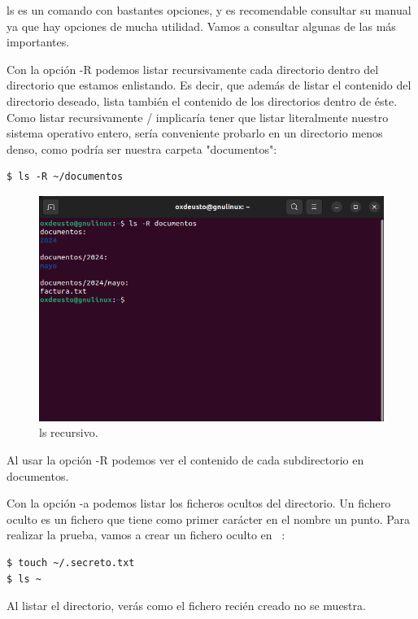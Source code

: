 ls es un comando con bastantes opciones, y es recomendable consultar su manual ya que hay opciones de mucha utilidad. Vamos a consultar algunas de las más importantes.

Con la opción -R podemos listar recursivamente cada directorio dentro del directorio que estamos enlistando. Es decir, que además de listar el contenido del directorio deseado, lista también el contenido de los directorios dentro de éste. Como listar recursivamente / implicaría tener que listar literalmente nuestro sistema operativo entero, sería conveniente probarlo en un directorio menos denso, como podría ser nuestra carpeta "documentos":

\begin{tcolorbox-code}
\begin{lstlisting}
$ ls -R ~/documentos
\end{lstlisting}
\end{tcolorbox-code}
\begin{figure}[H]
    \centering
    \includegraphics[width=0.80\linewidth]{resources/images/ls_2.png}
    \caption{ls recursivo.}
\end{figure}

Al usar la opción -R podemos ver el contenido de cada subdirectorio en documentos.

Con la opción -a podemos listar los ficheros ocultos del directorio. Un fichero oculto es un fichero que tiene como primer carácter en el nombre un punto. Para realizar la prueba, vamos a crear un fichero oculto en ~:

\begin{tcolorbox-code}
\begin{lstlisting}
$ touch ~/.secreto.txt
$ ls ~
\end{lstlisting}
\end{tcolorbox-code}

Al listar el directorio, verás como el fichero recién creado no se muestra.

